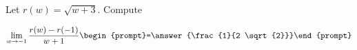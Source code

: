 \documentclass{ximera}
\author{Bart Snapp}
\begin{document}
\begin{exercise}
Let $r(w) = \sqrt{w+3}$. Compute

\[
\lim_{ w\to -1 } 
\frac{r(w)-r(-1)}{w+1} \begin{prompt}=\answer{\frac{1}{2 \sqrt{2}}}\end{prompt}
\]
\end{exercise}
\end{document}
